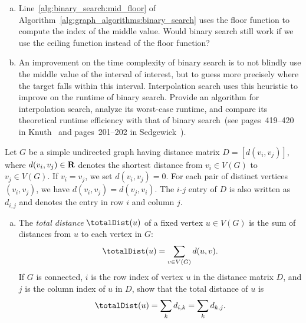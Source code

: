 \begin{problem}
\begin{enumerate}[(a)]
  \item Line~\ref{alg:binary_search:mid_floor} of
    Algorithm~\ref{alg:graph_algorithms:binary_search} uses the floor
    function to compute the index of the middle value. Would binary
    search still work if we use the ceiling function instead of the
    floor function?

  \item An improvement on the time complexity of
    binary search is to not blindly use the
    middle value of the interval of interest, but to guess more
    precisely where the target falls within this interval.
    Interpolation search uses this
    heuristic to improve on the runtime of binary search. Provide an
    algorithm for interpolation search,
    analyze its worst-case runtime, and compare its theoretical
    runtime efficiency with that of binary
    search~(see pages~419--420 in
    Knuth~\cite{Knuth1998c} and pages~201--202
    in Sedgewick~\cite{Sedgewick1990}).
  \end{enumerate}

\item Let $G$ be a simple undirected graph having distance matrix
  $D = [d(v_i, v_j)]$, where $d(v_i, v_j) \in \mathbf{R}$ denotes the shortest
  distance from $v_i \in V(G)$ to $v_j \in V(G)$. If $v_i = v_j$, we
  set $d(v_i, v_j) = 0$. For each pair of distinct vertices
  $(v_i, v_j)$, we have $d(v_i, v_j) = d(v_j, v_i)$. The $i$-$j$ entry
  of $D$ is also written as $d_{i,j}$ and denotes the entry in row $i$
  and column $j$.
  \begin{enumerate}[(a)]
  \item The \emph{total distance}
    $\totalDist(u)$\index{$\totalDist$} of a fixed vertex $u \in V(G)$
    is the sum of distances from $u$ to each vertex in $G$:
    \[
    \totalDist(u)
    =
    \sum_{v \in V(G)} d(u,v).
    \]
    If $G$ is connected, $i$ is the row index of vertex $u$ in the
    distance matrix $D$, and $j$ is the column index of $u$ in $D$,
    show that the total distance of $u$ is
    \begin{equation}
    \label{eqn:graph_algorithms:total_distance_vertex}
    \totalDist(u)
    =
    \sum_k d_{i,k}
    =
    \sum_k d_{k,j}.
    \end{equation}


\end{enumerate}
\end{problem}
